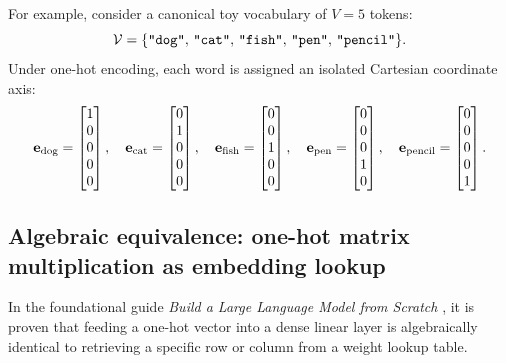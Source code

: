 \documentclass[../../main.tex]{subfiles}
\begin{document}
For example, consider a canonical toy vocabulary of $V=5$ tokens:
\begin{equation}
\label{eq:toy_vocab}
\mathcal{V} = \{\text{\texttt{"dog"}}, \, \text{\texttt{"cat"}}, \, \text{\texttt{"fish"}}, \, \text{\texttt{"pen"}}, \, \text{\texttt{"pencil"}}\}.
\end{equation}
Under one-hot encoding, each word is assigned an isolated Cartesian coordinate axis:
\begin{equation}
\label{eq:toy_onehots}
\mathbf{e}_{\text{dog}} = \begin{bmatrix} 1 \\ 0 \\ 0 \\ 0 \\ 0 \end{bmatrix}, \quad
\mathbf{e}_{\text{cat}} = \begin{bmatrix} 0 \\ 1 \\ 0 \\ 0 \\ 0 \end{bmatrix}, \quad
\mathbf{e}_{\text{fish}} = \begin{bmatrix} 0 \\ 0 \\ 1 \\ 0 \\ 0 \end{bmatrix}, \quad
\mathbf{e}_{\text{pen}} = \begin{bmatrix} 0 \\ 0 \\ 0 \\ 1 \\ 0 \end{bmatrix}, \quad
\mathbf{e}_{\text{pencil}} = \begin{bmatrix} 0 \\ 0 \\ 0 \\ 0 \\ 1 \end{bmatrix}.
\end{equation}

\subsection{Algebraic equivalence: one-hot matrix multiplication as embedding lookup}
\label{subsec:onehot_lookup_proof}

In the foundational guide \emph{Build a Large Language Model from Scratch} \cite{raschka2024llm}, it is proven that feeding a one-hot vector into a dense linear layer is algebraically identical to retrieving a specific row or column from a weight lookup table.
\end{document}
